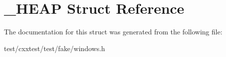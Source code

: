 \hypertarget{struct__HEAP}{\section{\-\_\-\-H\-E\-A\-P Struct Reference}
\label{struct__HEAP}
}


The documentation for this struct was generated from the following file\-:\begin{DoxyCompactItemize}
\item 
test/cxxtest/test/fake/windows.\-h\end{DoxyCompactItemize}
